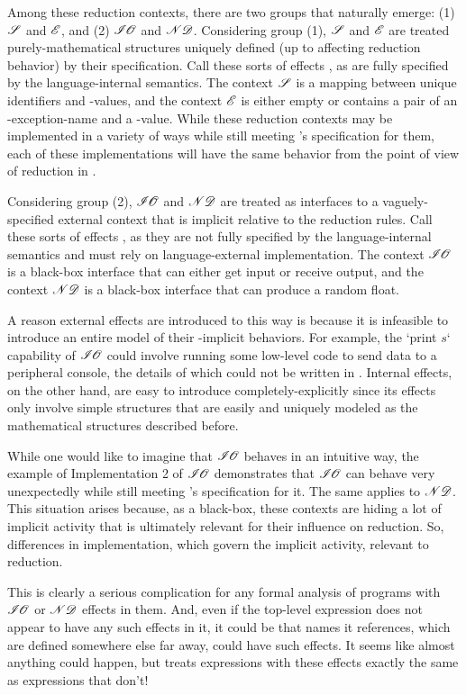Among these reduction contexts, there are two groups that naturally emerge:
(1) $\mathscr{S}$ and $\mathscr{E}$, and (2) $\mathscr{I\hspace{-0.1em}O}$ and $\mathscr{ND}$.
Considering group (1), $\mathscr{S}$ and $\mathscr{E}$ are treated purely-mathematical structures uniquely defined (up to affecting reduction behavior) by their specification.
Call these sorts of effects , as are fully specified by the language-internal semantics.
The context $\mathscr{S}$ is a mapping between unique identifiers and \LangB-values, and
the context $\mathscr{E}$ is either empty or contains a pair of an \LangB-exception-name and a \LangB-value.
While these reduction contexts may be implemented in a variety of ways while still meeting \LangB's specification for them, each of these implementations will have the same behavior from the point of view of reduction in \LangB.

Considering group (2), $\mathscr{I\hspace{-0.1em}O}$ and $\mathscr{ND}$ are treated as interfaces to a vaguely-specified external context that is implicit relative to the reduction rules.
Call these sorts of effects , as they are not fully specified by the language-internal semantics and must rely on language-external implementation.
The context $\mathscr{I\hspace{-0.1em}O}$ is a black-box interface that can either get input or receive output, and
the context $\mathscr{ND}$ is a black-box interface that can produce a random float.

A reason external effects are introduced to \LangB this way is because it is infeasible to introduce an entire model of their \LangB-implicit behaviors.
For example, the \code`print $s$` capability of $\mathscr{I\hspace{-0.1em}O}$ could involve running some low-level code to send data to a peripheral console, the details of which could not be written in \LangB.
Internal effects, on the other hand, are easy to introduce completely-explicitly since its effects only involve simple structures that are easily and uniquely modeled as the mathematical structures described before.

While one would like to imagine that $\mathscr{I\hspace{-0.1em}O}$ behaves in an intuitive way, the example of Implementation 2 of $\mathscr{I\hspace{-0.1em}O}$ demonstrates that $\mathscr{I\hspace{-0.1em}O}$ can behave very unexpectedly while still meeting \LangB's specification for it.
The same applies to $\mathscr{ND}$.
This situation arises because, as a black-box, these contexts are hiding a lot of implicit activity that is ultimately relevant for their influence on reduction.
So, differences in implementation, which govern the implicit activity,  relevant to reduction.

This is clearly a serious complication for any formal analysis of programs with $\mathscr{I\hspace{-0.1em}O}$ or $\mathscr{ND}$ effects in them.
And, even if the top-level expression does not appear to have any such effects in it, it could be that names it references, which are defined somewhere else far away, could have such effects.
It seems like almost anything could happen, but \LangB treats expressions with these effects exactly the same as expressions that don't!

